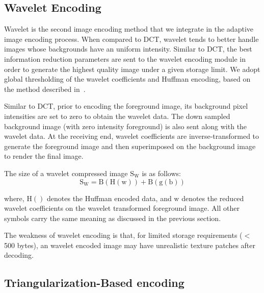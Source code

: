 \subsection{Wavelet Encoding}

Wavelet is the second image encoding method that we integrate in the adaptive image encoding process. When compared to DCT, wavelet tends to better handle images whose backgrounds have an uniform intensity. Similar to DCT, the best information reduction parameters are sent to the wavelet encoding module in order to generate the highest quality image under a given storage limit. We adopt global thresholding of the wavelet coefficients and Huffman encoding, based on the method described in~\cite{said1996new}.

Similar to DCT, prior to encoding the foreground image, its background pixel intensities are set to zero to obtain the wavelet data. The down sampled background image (with zero intensity foreground) is also sent along with the wavelet data. At the receiving end, wavelet coefficients are inverse-transformed to generate the foreground image and then superimposed on the background image to render the final image.


The size of a wavelet compressed image $\mathrm{S_{W}}$ is as follows:
\begin{equation}
\mathrm{S_{W} = B(H(w)) + B(g(b))}
\end{equation}

where, $\mathrm{H()}$ denotes the Huffman encoded data, and $\mathrm{w}$ denotes the reduced wavelet coefficients on the wavelet transformed foreground image. All other symbols carry the same meaning as discussed in the previous section.


The weakness of wavelet encoding is that, for limited storage requirements ($<$ 500 bytes), an wavelet encoded image may have unrealistic texture patches after decoding.

\subsection{Triangularization-Based encoding}

